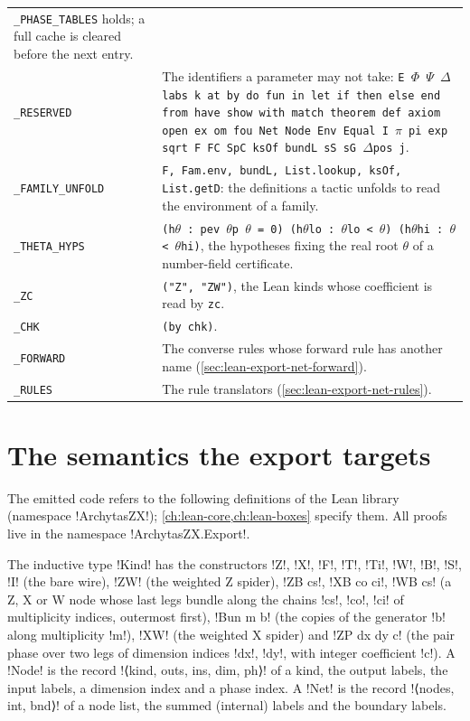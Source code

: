 {\begin{xltabular}{\linewidth}{@{}p{3.2cm}X@{}}
  \texttt{\_\allowbreak{}PHASE\_\allowbreak{}TABLES} holds; a full cache is cleared before the next entry. \\
\texttt{\_\allowbreak{}RESERVED} & The identifiers a parameter may not take: \texttt{E $\Phi$ $\Psi$ $\Delta$ labs k at by do fun in let if then else end from have show with match theorem def axiom open ex om fou Net Node Env Equal I $\pi$ pi exp sqrt F FC SpC ksOf bundL sS sG $\Delta$pos j}. \\
\texttt{\_\allowbreak{}FAMILY\_\allowbreak{}UNFOLD} & \texttt{F, Fam.env, bundL, List.lookup, ksOf, List.getD}: the definitions a
  tactic unfolds to read the environment of a family. \\
\texttt{\_\allowbreak{}THETA\_\allowbreak{}HYPS} & \texttt{(h$\theta$ : pev $\theta$p $\theta$ = 0) (h$\theta$lo : $\theta$lo \textless{} $\theta$) (h$\theta$hi : $\theta$ \textless{} $\theta$hi)}, the hypotheses
  fixing the real root $\theta$ of a number-field certificate. \\
\texttt{\_\allowbreak{}ZC} & \texttt{("Z", "ZW")}, the Lean kinds whose coefficient is read by \texttt{zc}. \\
\texttt{\_\allowbreak{}CHK} & \texttt{(by chk)}. \\
\texttt{\_\allowbreak{}FORWARD} & The converse rules whose forward rule has another name
  (\cref{sec:lean-export-net-forward}). \\
\texttt{\_\allowbreak{}RULES} & The rule translators (\cref{sec:lean-export-net-rules}). \\
\bottomrule
\end{xltabular}

\section{The semantics the export targets}\label{sec:lean-export-net-semantics}

The emitted code refers to the following definitions of the Lean library (namespace
\lean!ArchytasZX!); \cref{ch:lean-core,ch:lean-boxes} specify them. All proofs live in the
namespace \lean!ArchytasZX.Export!.

\begin{definition}\label{def:lean-export-net-net}
The inductive type \lean!Kind! has the constructors \lean!Z!, \lean!X!, \lean!F!, \lean!T!,
\lean!Ti!, \lean!W!, \lean!B!, \lean!S!, \lean!I! (the bare wire), \lean!ZW! (the weighted Z
spider), \lean!ZB cs!, \lean!XB co ci!, \lean!WB cs! (a Z, X or W node whose last legs bundle
along the chains \lean!cs!, \lean!co!, \lean!ci! of multiplicity indices, outermost first),
\lean!Bun m b! (the copies of the generator \lean!b! along multiplicity \lean!m!), \lean!XW!
(the weighted X spider) and \lean!ZP dx dy c! (the pair phase over two legs of dimension indices
\lean!dx!, \lean!dy!, with integer coefficient \lean!c!). A \lean!Node! is the record \lean!⟨kind, outs, ins, dim, ph⟩! of a kind,
the output labels, the input labels, a dimension index and a phase index. A \lean!Net! is the
record \lean!⟨nodes, int, bnd⟩! of a node list, the summed (internal) labels and the boundary
labels.
\end{definition}

}
